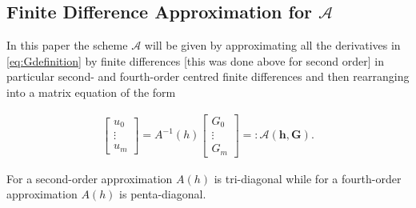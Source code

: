 \documentclass[SingleSpace,12pt,Proceedings]{Serre_ASCE}
\begin{document}
\subsection{Finite Difference Approximation for $\mathcal{A}$}
\label{section:ellipticA}
In this paper the scheme $\mathcal{A}$ will be given by approximating all the derivatives in \eqref{eq:Gdefinition} by finite differences [this was done above for second order] in particular second- and fourth-order centred finite differences and then rearranging into a matrix equation of the form
\begin{linenomath*}
\begin{gather*}
\left[\begin{array}{c}
  u_0 \\
  \vdots \\
  u_m \end{array}\right] = A^{-1}\left(h\right)
\left[\begin{array}{c}
 G_0 \\
 \vdots \\
 G_m \end{array}\right] =: \mathcal{A}(\boldsymbol{h},\boldsymbol{G}). 
\end{gather*}
\end{linenomath*}
For a second-order approximation $A\left(h\right)$ is tri-diagonal while for a fourth-order approximation $A\left(h\right)$ is penta-diagonal.
\end{document}
